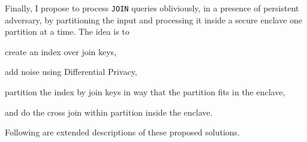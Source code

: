 		Finally, I propose to process \texttt{JOIN} queries obliviously, in a presence of persistent adversary, by partitioning the input and processing it inside a secure enclave one partition at a time.
		The idea is to
		\begin{enumerate*}[label=(\roman*)] %
			\item create an index over join keys,
			\item add noise using Differential Privacy,
			\item partition the index by join keys in way that the partition fits in the enclave,
			\item and do the cross join within partition inside the enclave.
		\end{enumerate*}

	Following are extended descriptions of these proposed solutions.
